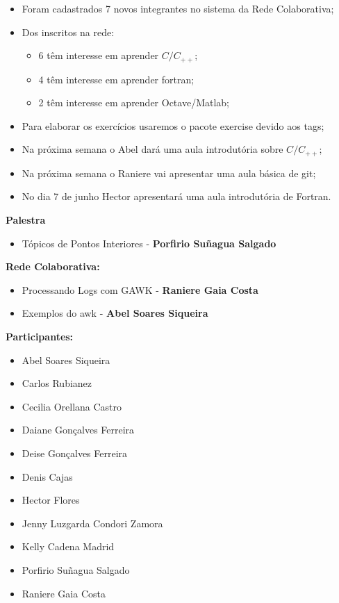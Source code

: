 \documentclass[12pt]{article}
\begin{document}
\begin{itemize}
\item Foram cadastrados 7 novos integrantes no sistema da Rede Colaborativa;
\item Dos inscritos na rede:
\begin{itemize}
\item 6 t\^em interesse em aprender $C/C_{++}$;
\item 4 t\^em interesse em aprender fortran;
\item 2 t\^em interesse em aprender Octave/Matlab;
\end{itemize}
\item Para elaborar os exerc\'icios usaremos o pacote exercise devido aos tags;
\item Na pr\'oxima semana o Abel dar\'a uma aula introdut\'oria sobre $C/C_{++}$;
\item Na pr\'oxima semana o Raniere vai apresentar uma aula b\'asica de git;
\item No dia 7 de junho Hector apresentar\'a uma aula introdut\'oria de Fortran.
\end{itemize}

{\bf Palestra}

\begin{itemize}
\item T\'opicos de Pontos Interiores - {\bf Porfirio Su\~nagua Salgado}
\end{itemize}

{\bf Rede Colaborativa:}

\begin{itemize}
\item Processando Logs com GAWK - {\bf Raniere Gaia Costa}
\item Exemplos do awk - {\bf Abel Soares Siqueira}
\end{itemize}

{\bf{Participantes:}}

\begin{itemize}
\item Abel Soares Siqueira
\item Carlos Rubianez
\item Cecilia Orellana Castro
\item Daiane Gon\c{c}alves Ferreira
\item Deise Gon\c{c}alves Ferreira
\item Denis Cajas
\item Hector Flores
\item Jenny Luzgarda Condori Zamora
\item Kelly Cadena Madrid
\item Porfirio Su\~nagua Salgado
\item Raniere Gaia Costa
\end{itemize}
\end{document}
